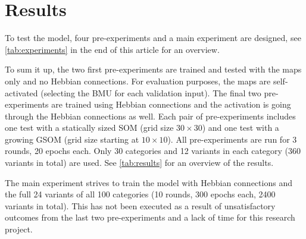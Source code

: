 \documentclass[twocolumn]{article}
\begin{document}
\section{Results} \label{sec:results}
To test the model, four pre-experiments and a main experiment are designed, see \autoref{tab:experiments} in the end of this article for an overview.

To sum it up, the two first pre-experiments are trained and tested with the maps only and no Hebbian connections. For evaluation purposes, the maps are self-activated (selecting the BMU for each validation input). The final two pre-experiments are trained using Hebbian connections and the activation is going through the Hebbian connections as well. Each pair of pre-experiments includes one test with a statically sized SOM (grid size $30 \times 30$) and one test with a growing GSOM (grid size starting at $10 \times 10$). All pre-experiments are run for 3 rounds, 20 epochs each. Only 30 categories and 12 variants in each category (360 variants in total) are used. See \autoref{tab:results} for an overview of the results.

The main experiment strives to train the model with Hebbian connections and the full 24 variants of all 100 categories (10 rounds, 300 epochs each, 2400 variants in total). This has not been executed as a result of unsatisfactory outcomes from the last two pre-experiments and a lack of time for this research project.
\end{document}
